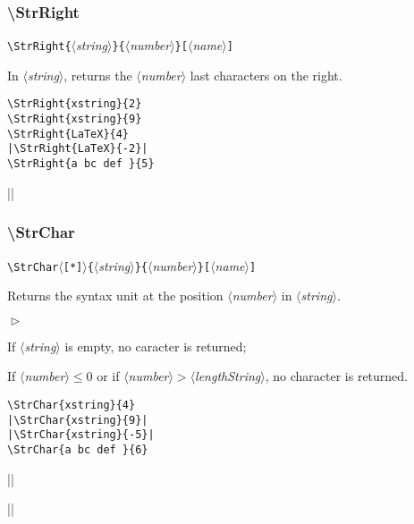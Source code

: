 \documentclass[a4paper,10pt]{article}
\newcommand\argu[1]{$\langle$\textit{#1}$\rangle$}
\newcommand\ARGU[1]{\texttt{\{}\argu{#1}\texttt{\}}}
\newcommand\arguC[1]{\texttt{[}\argu{#1}\texttt{]}}
\newcommand\etoile{$\langle$\texttt{[*]}$\rangle$}
\newenvironment{Conditions}[1][1cm]%
{\begin{list}%
	{$\vartriangleright$}%
	{\setlength{\leftmargin}{#1}
	 \setlength{\itemsep}{0pt}
	 \setlength{\parsep}{0pt}
	 \setlength{\topsep}{2ptplus3ptminus2pt}
	}}%
{\end{list}}
\newcommand\US{syntax unit\xspace}
\newcommand\styleexemple{\small\vskip4pt}
\newcommand\verbinline{\lstinline[basicstyle=\normalsize\ttfamily]}
\begin{document}
\subsubsection{\ttfamily\textbackslash StrRight}

\verbinline|\StrRight|\ARGU{string}\ARGU{number}\arguC{name}
\smallskip

In \argu{string}, returns the \argu{number} last characters on the right.\medskip

\begin{minipage}[t]{0.65\linewidth}
\begin{lstlisting}
\StrRight{xstring}{2}
\StrRight{xstring}{9}
\StrRight{LaTeX}{4}
|\StrRight{LaTeX}{-2}|
\StrRight{a bc def }{5}
\end{lstlisting}%
\end{minipage}\hfill
\begin{minipage}[t]{0.35\linewidth}
	\styleexemple
	\par
	\par
	\par
	||\par
\end{minipage}%

\subsubsection{\ttfamily\textbackslash StrChar}

\verbinline|\StrChar|\etoile\ARGU{string}\ARGU{number}\arguC{name}
\smallskip

Returns the \US at the position \argu{number} in \argu{string}.\medskip

\begin{Conditions}
\item If \argu{string} is empty, no caracter is returned;
\item If \argu{number}${}\leqslant0$ or if \argu{number}${}>{}$\argu{lengthString}, no character is returned.
\end{Conditions}

\begin{minipage}[t]{0.65\linewidth}
\begin{lstlisting}
\StrChar{xstring}{4}
|\StrChar{xstring}{9}|
|\StrChar{xstring}{-5}|
\StrChar{a bc def }{6}
\end{lstlisting}%
\end{minipage}\hfill
\begin{minipage}[t]{0.35\linewidth}
	\styleexemple
	\par
	||\par
	||\par
\end{minipage}%
\end{document}
